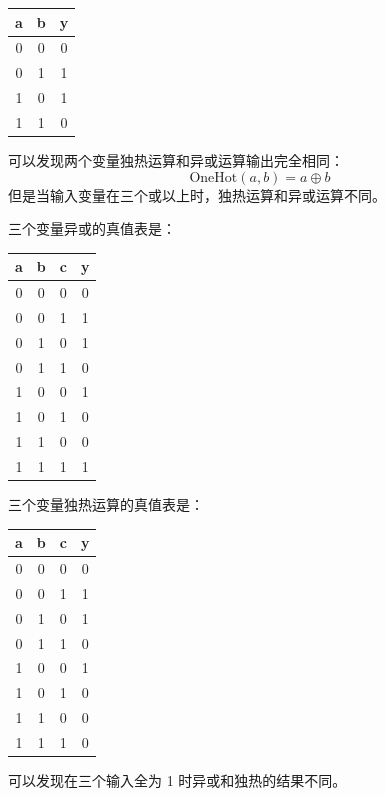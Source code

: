 \begin{longtable}{|c|c|c|}
\hline
\textbf{a} & \textbf{b} & \textbf{y} \\ \hline
\endhead
0 & 0 & 0 \\ \hline
0 & 1 & 1 \\ \hline
1 & 0 & 1 \\ \hline
1 & 1 & 0 \\ \hline
\end{longtable}

\begin{remark}{}{}
  可以发现两个变量独热运算和异或运算输出完全相同：
  $$\mathrm{OneHot}(a, b) = a \oplus b$$
  但是当输入变量在三个或以上时，独热运算和异或运算不同。

  \begin{example}{}{}
    三个变量异或的真值表是：
    \begin{longtable}{|c|c|c|c|}
    \hline
    \textbf{a} & \textbf{b} & \textbf{c} & \textbf{y} \\ \hline
    \endhead
    0 & 0 & 0 & 0 \\ \hline
    0 & 0 & 1 & 1 \\ \hline
    0 & 1 & 0 & 1 \\ \hline
    0 & 1 & 1 & 0 \\ \hline
    1 & 0 & 0 & 1 \\ \hline
    1 & 0 & 1 & 0 \\ \hline
    1 & 1 & 0 & 0 \\ \hline
    1 & 1 & 1 & 1 \\ \hline
    \end{longtable}

    三个变量独热运算的真值表是：
    \begin{longtable}{|c|c|c|c|}
    \hline
    \textbf{a} & \textbf{b} & \textbf{c} & \textbf{y} \\ \hline
    \endhead
    0 & 0 & 0 & 0 \\ \hline
    0 & 0 & 1 & 1 \\ \hline
    0 & 1 & 0 & 1 \\ \hline
    0 & 1 & 1 & 0 \\ \hline
    1 & 0 & 0 & 1 \\ \hline
    1 & 0 & 1 & 0 \\ \hline
    1 & 1 & 0 & 0 \\ \hline
    1 & 1 & 1 & 0 \\ \hline
    \end{longtable}

    可以发现在三个输入全为 1 时异或和独热的结果不同。
  \end{example}
\end{remark}

